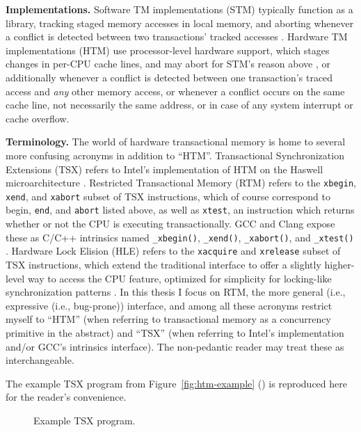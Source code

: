 {\bf Implementations.}
Software TM implementations (STM) typically function as a library,
tracking staged memory accesses in local memory,
and aborting whenever a conflict is detected between two transactions' tracked accesses \cite{stm-pldi06}.
Hardware TM implementations (HTM) use processor-level hardware support,
which stages changes in per-CPU cache lines,
and may abort for STM's reason above \cite{htm-experience},
or additionally whenever a conflict is detected between one transaction's traced access and {\em any} other memory access,
or whenever a conflict occurs on the same cache line, not necessarily the same address,
or in case of any system interrupt or cache overflow.

{\bf Terminology.}
The world of hardware transactional memory is home to several more confusing acronyms in addition to ``HTM''.
Transactional Synchronization Extensions (TSX)
refers to Intel's implementation of HTM on the Haswell microarchitecture
\cite{htm-haswell}.
Restricted Transactional Memory (RTM)
refers to the {\tt xbegin}, {\tt xend}, and {\tt xabort} subset of TSX instructions,
which of course correspond to {\sf begin}, {\tt end}, and {\tt abort} listed above,
as well as {\tt xtest}, an instruction which returns whether or not the CPU is executing transactionally.
GCC and Clang expose these as C/C++ intrinsics named {\tt \_xbegin()}, {\tt \_xend()}, {\tt \_xabort()}, and {\tt \_xtest()}
\cite{htm-gcc}.
Hardware Lock Elision (HLE)
refers to the {\tt xacquire} and {\tt xrelease} subset of TSX instructions,
which extend the traditional interface to offer a slightly higher-level way to access the CPU feature,
optimized for simplicity for locking-like synchronization patterns
\cite{hardware-lock-elision}.
In this thesis I focus on RTM, the more general (i.e., expressive (i.e., bug-prone)) interface,
and among all these acronyms restrict myself to ``HTM''
(when referring to transactional memory as a concurrency primitive in the abstract)
and ``TSX''
(when referring to Intel's implementation and/or GCC's intrinsics interface).
The non-pedantic reader may treat these as interchangeable.

The example TSX program from Figure~\ref{fig:htm-example} (\sect{\ref{sec:overview-tm}})
is reproduced here for the reader's convenience.

\begin{figure}[h]
	
	\caption{Example TSX program.}
	\label{fig:htm-example-reproduced}
\end{figure}

